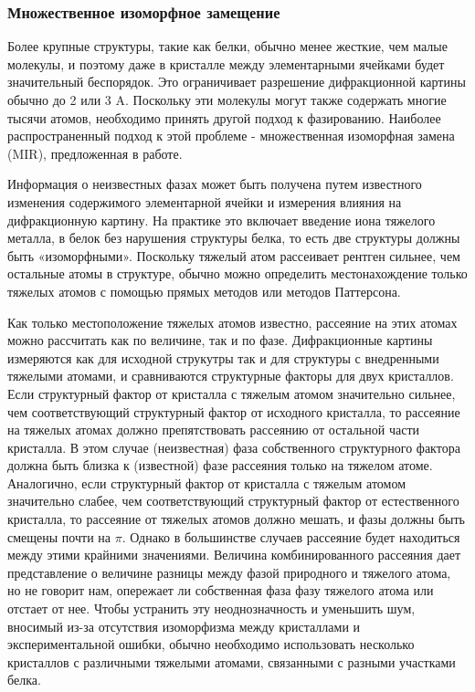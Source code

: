 \documentclass{article}
\begin{document}
\subsubsection{Множественное изоморфное замещение}
Более крупные структуры, такие как белки, обычно менее жесткие, чем малые молекулы, и поэтому даже в кристалле между элементарными ячейками будет значительный беспорядок. Это ограничивает разрешение дифракционной картины обычно до 2 или 3 A. Поскольку эти молекулы могут также содержать многие тысячи атомов, необходимо принять другой подход к фазированию. Наиболее распространенный подход к этой проблеме - множественная изоморфная замена (MIR), предложенная в работе\cite{PERUTZ1960}.

Информация о неизвестных фазах может быть получена путем известного изменения содержимого элементарной ячейки и измерения влияния на дифракционную картину. На практике это включает введение иона тяжелого металла, в белок без нарушения структуры белка, то есть две структуры должны быть «изоморфными». Поскольку тяжелый атом рассеивает рентген сильнее, чем остальные атомы в структуре, обычно можно определить местонахождение только тяжелых атомов с помощью прямых методов или методов Паттерсона.

Как только местоположение тяжелых атомов известно, рассеяние на этих атомах можно рассчитать как по величине, так и по фазе. Дифракционные картины измеряются как для исходной струкутры так и для структуры с внедренными тяжелыми атомами, и сравниваются структурные факторы для двух кристаллов. Если структурный фактор от кристалла с тяжелым атомом значительно сильнее, чем соответствующий структурный фактор от исходного кристалла, то рассеяние на тяжелых атомах должно препятствовать рассеянию от остальной части кристалла. В этом случае (неизвестная) фаза собственного структурного фактора должна быть близка к (известной) фазе рассеяния только на тяжелом атоме.
Аналогично, если структурный фактор от кристалла с тяжелым атомом значительно слабее, чем соответствующий структурный фактор от естественного кристалла, то рассеяние от тяжелых атомов должно мешать, и фазы должны быть смещены почти на $\pi$. Однако в большинстве случаев рассеяние будет находиться между этими крайними значениями. Величина комбинированного рассеяния дает представление о величине разницы между фазой природного и тяжелого атома, но не говорит нам, опережает ли собственная фаза фазу тяжелого атома или отстает от нее. Чтобы устранить эту неоднозначность и уменьшить шум, вносимый из-за отсутствия изоморфизма между кристаллами и экспериментальной ошибки, обычно необходимо использовать несколько кристаллов с различными тяжелыми атомами, связанными с разными участками белка\cite{ProtXR}.
\end{document}
